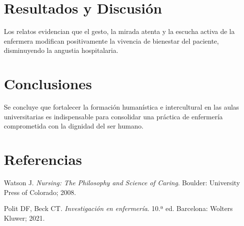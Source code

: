 \documentclass[11pt,a4paper]{article}
\begin{document}
\section{Resultados y Discusión}
Los relatos evidencian que el gesto, la mirada atenta y la escucha activa de la enfermera modifican positivamente la vivencia de bienestar del paciente, disminuyendo la angustia hospitalaria.

\section{Conclusiones}
Se concluye que fortalecer la formación humanística e intercultural en las aulas universitarias es indispensable para consolidar una práctica de enfermería comprometida con la dignidad del ser humano.

\section*{Referencias}
\begin{enumerate}[label={[\arabic*]}, leftmargin=1cm]
    \item Watson J. \textit{Nursing: The Philosophy and Science of Caring}. Boulder: University Press of Colorado; 2008.
    \item Polit DF, Beck CT. \textit{Investigación en enfermería}. 10.ª ed. Barcelona: Wolters Kluwer; 2021.
\end{enumerate}
\end{document}
